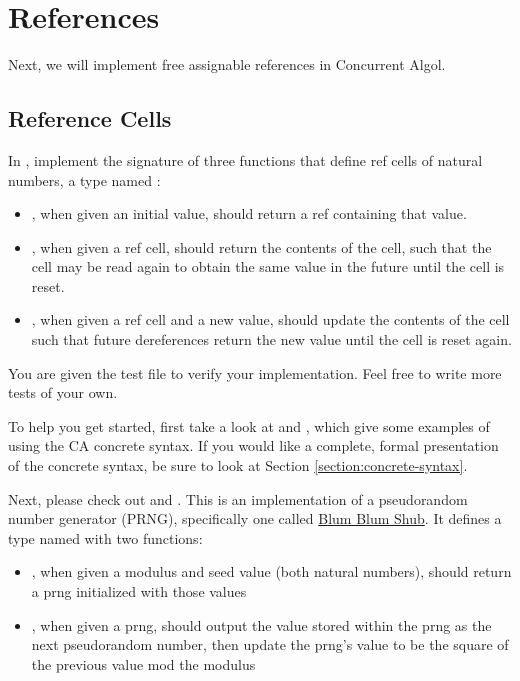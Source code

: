 \documentclass[11pt]{article}
\begin{document}
\section{References}\label{sec:refs}

Next, we will implement free assignable references in Concurrent Algol.

\subsection{Reference Cells}

 In , implement the signature of three functions
that define ref cells of natural numbers, a type named :
\begin{itemize}
  \item {}, when given an initial value, should return a ref containing that value.
  \item {}, when given a ref cell, should return the contents of the cell,
        such that the cell may be read again to obtain the same value in the future until
        the cell is reset.
  \item {}, when given a ref cell and a new value, should update the contents of the cell
        such that future dereferences return the new value until the cell is reset again.
\end{itemize}

You are given the test file  to verify your implementation. Feel free to write more tests of your own.

To help you get started, first take a look at  and , which give some examples of using the CA concrete syntax. If you would like a complete, formal presentation of the concrete syntax, be sure to look at Section \ref{section:concrete-syntax}.

Next, please check out  and . This is an implementation of a pseudorandom number generator (PRNG), specifically one called \href{https://en.wikipedia.org/wiki/Blum_Blum_Shub}{Blum Blum Shub}. It defines a type named  with two functions:
\begin{itemize}
  \item {}, when given a modulus and seed value (both natural numbers), should return a prng initialized with those values
  \item {}, when given a prng, should output the value stored within the prng as the next pseudorandom number, then update the prng's value to be the square of the previous value mod the modulus
\end{itemize}
\end{document}
